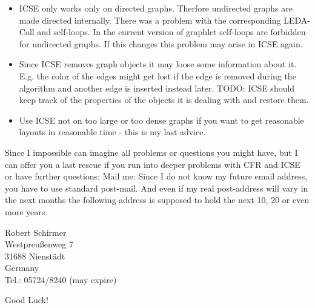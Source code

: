 \documentclass[notitlepage,fleqn]{article}
\begin{document}
{\begin{itemize}
      \item ICSE only works only on directed graphs. Therfore undirected
        graphs are made directed internally. There was a problem
        with the corresponding LEDA-Call and self-loops. In the
        current version of graphlet self-loops are forbidden
        for undirected graphs. If this changes this problem may
        arise in ICSE again.
        
      \item Since ICSE removes graph objects it may loose some
        information about it. E.g. the color of the edges might
        get lost if the edge is removed during the algorithm
        and another edge is inserted instead later. TODO: ICSE
        should keep track of the properties of the objects it is
        dealing with and restore them.

      \item Use ICSE not on too large or too dense graphs if
        you want to get reasonable layouts in reasonable time - 
        this is my last advice.
  \end{itemize}

  Since I impossible can imagine all problems or questions you might
  have, but
  I can offer you a last rescue if you run into deeper problems with CFR and
  ICSE or have further questions: Mail me:
  Since I do not know my future email address, you have to use
  standard post-mail. And even if my real post-address will vary in
  the next months the following address is supposed to hold the next
  10, 20 or even more years.
    
  \bigskip
  \begin{center}
    Robert Schirmer \\
    Westpreu\ss{}enweg 7 \\
    31688 Nienst\"a{}dt \\
    Germany \\
    Tel.: 05724/8240 (may expire)
  \end{center}

  \bigskip
  \begin{center}
    Good Luck!
  \end{center}
}
\end{document}

